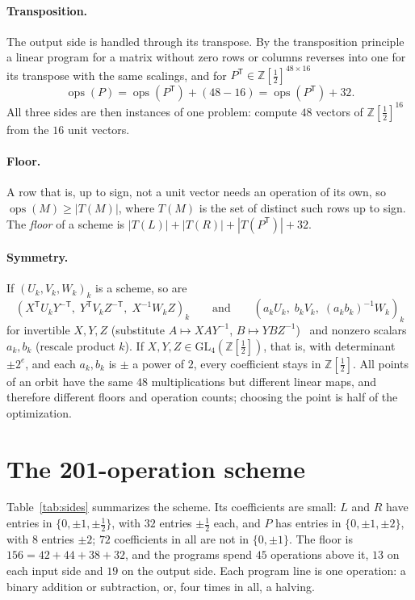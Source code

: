 \documentclass[11pt]{article}
\theoremstyle{remark}
\newcommand{\Z}{\mathbb{Z}}
\newcommand{\Zh}{\Z[\tfrac12]}
\newcommand{\Pt}{P^{\mathsf T}}
\newcommand{\ops}{\operatorname{ops}}
\begin{document}
\paragraph{Transposition.}  The output side is handled through its
transpose.  By the transposition principle~\cite{BCS97} a linear program
for a matrix without zero rows or columns reverses into one for its
transpose with the same scalings, and for $\Pt\in\Zh^{48\times16}$
\[
\ops(P)=\ops(\Pt)+(48-16)=\ops(\Pt)+32 .
\]
All three sides are then instances of one problem: compute $48$ vectors
of $\Zh^{16}$ from the $16$ unit vectors.

\paragraph{Floor.}  A row that is, up to sign, not a unit vector needs an
operation of its own, so $\ops(M)\ge|T(M)|$, where $T(M)$ is the set of
distinct such rows up to sign.  The \emph{floor} of a scheme is
$|T(L)|+|T(R)|+|T(\Pt)|+32$.

\paragraph{Symmetry.}  If $(U_k,V_k,W_k)_k$ is a scheme, so are
\[
(X^{\mathsf T}U_kY^{-\mathsf T},\;Y^{\mathsf T}V_kZ^{-\mathsf T},\;
X^{-1}W_kZ)_k
\qquad\text{and}\qquad
(a_kU_k,\;b_kV_k,\;(a_kb_k)^{-1}W_k)_k
\]
for invertible $X,Y,Z$ (substitute $A\mapsto XAY^{-1}$,
$B\mapsto YBZ^{-1}$)~\cite{deGroote78} and nonzero scalars $a_k,b_k$
(rescale product $k$).  If $X,Y,Z\in\mathrm{GL}_4(\Zh)$, that is, with
determinant $\pm2^e$, and each $a_k,b_k$ is $\pm$ a power of $2$, every
coefficient stays in $\Zh$.  All points of an orbit have
the same $48$ multiplications but different linear maps, and therefore
different floors and operation counts; choosing the point is half of the
optimization.

\section{The 201-operation scheme}\label{sec:scheme}

Table~\ref{tab:sides} summarizes the scheme.  Its coefficients are
small: $L$ and $R$ have entries in $\{0,\pm1,\pm\tfrac12\}$, with $32$
entries $\pm\frac12$ each, and $P$ has entries in $\{0,\pm1,\pm2\}$,
with $8$ entries $\pm2$; $72$ coefficients in all are not in
$\{0,\pm1\}$.  The floor is $156=42+44+38+32$, and the programs spend
$45$ operations above it, $13$ on each input side and $19$ on the
output side.  Each program line is one operation: a binary addition or
subtraction, or, four times in all, a halving.
\end{document}
